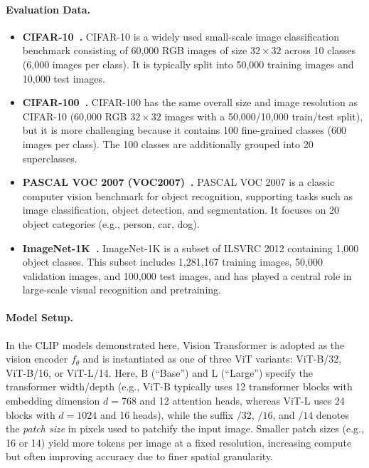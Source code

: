 \documentclass[../../book-main.tex]{subfiles}
\begin{document}
\paragraph{Evaluation Data.}
\begin{itemize}
    \item \textbf{CIFAR-10~\citep{krizhevsky2009learning}.}
    CIFAR-10 is a widely used small-scale image classification benchmark consisting of 60{,}000 RGB images of size \(32 \times 32\) across 10 classes (6{,}000 images per class).
    It is typically split into 50{,}000 training images and 10{,}000 test images.
    \item \textbf{CIFAR-100~\citep{krizhevsky2009learning}.}
    CIFAR-100 has the same overall size and image resolution as CIFAR-10 (60{,}000 RGB \(32 \times 32\) images with a 50{,}000/10{,}000 train/test split), but it is more challenging because it contains 100 fine-grained classes (600 images per class).
    The 100 classes are additionally grouped into 20 superclasses.

    \item \textbf{PASCAL VOC 2007 (VOC2007)~\citep{everingham2010pascal}.}
    PASCAL VOC 2007 is a classic computer vision benchmark for object recognition, supporting tasks such as image classification, object detection, and segmentation.
    It focuses on 20 object categories (e.g., person, car, dog).
    \item \textbf{ImageNet-1K~\citep{imagenet_cvpr09}.}
    ImageNet-1K is a subset of ILSVRC 2012 containing 1{,}000 object classes.
    This subset includes 1{,}281{,}167 training images, 50{,}000 validation images, and 100{,}000 test images, and has played a central role in large-scale visual recognition and pretraining.
\end{itemize}

\paragraph{Model Setup.}
In the CLIP models demonstrated here, Vision Transformer is adopted as the vision encoder \(f_{\theta}\) and is instantiated as one of three ViT variants: ViT-B/32, ViT-B/16, or ViT-L/14.
Here, \(\mathrm{B}\) (``Base'') and \(\mathrm{L}\) (``Large'') specify the transformer width/depth (e.g., ViT-B typically uses 12 transformer blocks with embedding dimension \(d=768\) and 12 attention heads, whereas ViT-L uses 24 blocks with \(d=1024\) and 16 heads), while the suffix \(/32\), \(/16\), and \(/14\) denotes the \textit{patch size} in pixels used to patchify the input image.
Smaller patch sizes (e.g., 16 or 14) yield more tokens per image at a fixed resolution, increasing compute but often improving accuracy due to finer spatial granularity.
\end{document}
